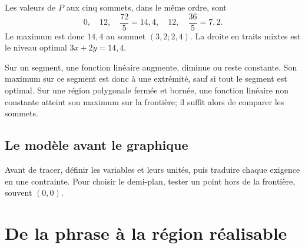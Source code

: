 \begin{center}
\end{center}

Les valeurs de $P$ aux cinq sommets, dans le même ordre, sont
\[
0,\quad12,\quad\frac{72}{5}=14{,}4,\quad12,\quad\frac{36}{5}=7{,}2.
\]
Le maximum est donc $14{,}4$ au sommet $(3{,}2;2{,}4)$. La droite en
traits mixtes est le niveau optimal $3x+2y=14{,}4$.

\begin{connectionbox}
Sur un segment, une fonction linéaire augmente, diminue ou reste constante. Son maximum sur ce segment est donc à une extrémité, sauf si tout le segment est optimal. Sur une région polygonale fermée et bornée, une fonction linéaire non constante atteint son maximum sur la frontière; il suffit alors de comparer les sommets.
\end{connectionbox}

\subsection{Le modèle avant le graphique}
Avant de tracer, définir les variables et leurs unités, puis traduire chaque exigence en une contrainte. Pour choisir le demi-plan, tester un point hors de la frontière, souvent $(0,0)$.


\section{De la phrase à la région réalisable}
\label{manual:section:13.06}

